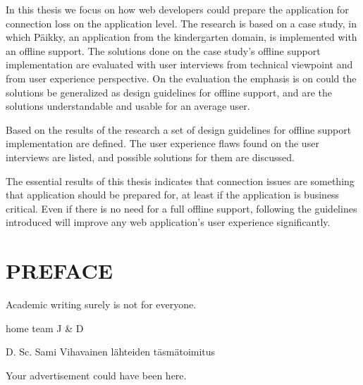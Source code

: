 In this thesis we focus on how web developers could prepare the application for connection loss on the application level. The research is based on a case study, in which Päikky, an application from the kindergarten domain, is implemented with an offline support. The solutions done on the case study's offline support implementation are evaluated with user interviews from technical viewpoint and from user experience perspective. On the evaluation the emphasis is on could the solutions be generalized as design guidelines for offline support, and are the solutions understandable and usable for an average user.

Based on the results of the research a set of design guidelines for offline support implementation are defined. The user experience flaws found on the user interviews are listed, and possible solutions for them are discussed.

The essential results of this thesis indicates that connection issues are something that application should be prepared for, at least if the application is business critical. Even if there is no need for a full offline support, following the guidelines introduced will improve any web application's user experience significantly.







\newpage
 
\chapter*{PREFACE}
\noindent 

Academic writing surely is not for everyone.

home team J & D

D. Sc. Sami Vihavainen lähteiden täsmätoimitus


Your advertisement could have been here.



\newpage
\tableofcontents










\newpage
\renewcommand{\chaptermark}[1]{\markboth{\thechapter. \ #1}{}}
\renewcommand{\sectionmark}[1]{\markright{}{}}
\lhead{\fancyplain{}{\leftmark}}
 
